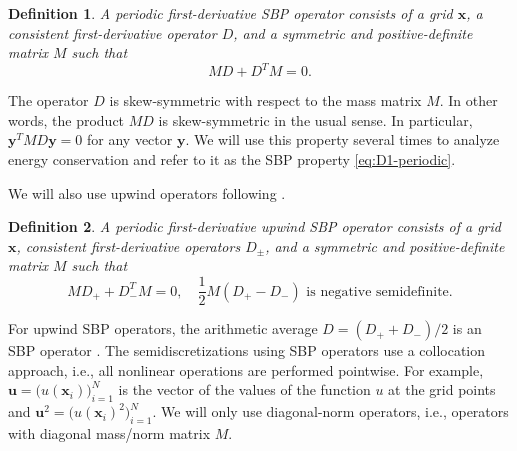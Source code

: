 \documentclass{article}
\newtheorem{defn}{Definition}
\begin{document}
\begin{defn}
    A \emph{periodic first-derivative SBP operator}
    consists of
    a grid $\pmb{x}$,
    a consistent first-derivative operator $D$,
    and a symmetric and positive-definite matrix $M$
    such that
    \begin{equation}
    \label{eq:D1-periodic}
      M D + D^T M = 0.
    \end{equation}
\end{defn}
The operator $D$ is skew-symmetric with respect to the mass matrix $M$.
In other words, the product $M D$ is skew-symmetric in the usual sense. In particular,
$\pmb{y}^T M D \pmb{y} = 0$ for any vector $\pmb{y}$. We will use this property
several times to analyze energy conservation and refer to it as the
SBP property \eqref{eq:D1-periodic}.

We will also use upwind operators following \cite{mattsson2017diagonal}.
\begin{defn}
    A \emph{periodic first-derivative upwind SBP operator}
    consists of
    a grid $\pmb{x}$,
    consistent first-derivative operators $D_\pm$,
    and a symmetric and positive-definite matrix $M$
    such that
    \begin{equation}
    \label{eq:D1-upwind-periodic}
      M D_+ + D_-^T M = 0,
      \quad
      \frac{1}{2} M (D_+ - D_-) \text{ is negative semidefinite}.
    \end{equation}
\end{defn}

For upwind SBP operators, the arithmetic average $D = (D_+ + D_-) / 2$ is
an SBP operator \cite{mattsson2017diagonal}.
The semidiscretizations using SBP operators use a collocation approach,
i.e., all nonlinear operations are performed pointwise. For example,
$\pmb{u} = \bigl(u(\pmb{x}_i)\bigr)_{i=1}^N$
is the vector of the values of the function $u$ at the grid points and
$\pmb{u}^2 = \bigl(u(\pmb{x}_i)^2\bigr)_{i=1}^N$. We will only use
diagonal-norm operators, i.e., operators with diagonal mass/norm matrix $M$.
\end{document}
